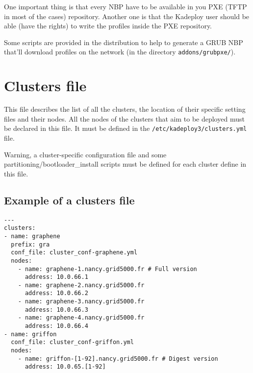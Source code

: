 \documentclass[a4wide,10pt,oneside]{book}
\begin{document}
One important thing is that every NBP have to be available in you PXE (TFTP in most of the cases) repository. Another one is that the Kadeploy user should be able (have the rights) to write the profiles inside the PXE repository.

Some scripts are provided in the distribution to help to generate a GRUB NBP that'll download profiles on the network (in the directory \texttt{addons/grubpxe/}).


\section{Clusters file\label{sec:clusters_conf}}
This file describes the list of all the clusters, the location of their specific setting files and their nodes. All the nodes of the clusters that aim to be deployed must be declared in this file. It must be defined in the  \texttt{/etc/kadeploy3/clusters.yml} file.

Warning, a cluster-specific configuration file and some partitioning/bootloader\_install scripts must be defined for each cluster define in this file.

\subsection{Example of a clusters file\\}
\begin{small}
\begin{verbatim}
---
clusters:
- name: graphene
  prefix: gra
  conf_file: cluster_conf-graphene.yml
  nodes:
    - name: graphene-1.nancy.grid5000.fr # Full version
      address: 10.0.66.1
    - name: graphene-2.nancy.grid5000.fr
      address: 10.0.66.2
    - name: graphene-3.nancy.grid5000.fr
      address: 10.0.66.3
    - name: graphene-4.nancy.grid5000.fr
      address: 10.0.66.4
- name: griffon
  conf_file: cluster_conf-griffon.yml
  nodes:
    - name: griffon-[1-92].nancy.grid5000.fr # Digest version
      address: 10.0.65.[1-92]
\end{verbatim}
\end{small}
\end{document}
